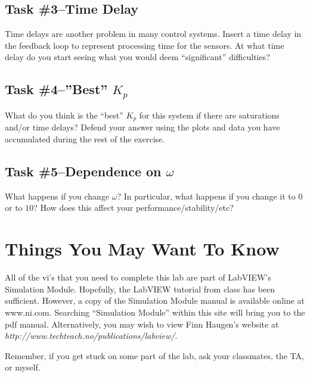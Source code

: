 \subsection{Task \#3--Time Delay}

Time delays are another problem in many control systems.  Insert a time delay in
the feedback loop to represent processing time for the sensors.  At what time
delay do you start seeing what you would deem ``significant'' difficulties?  

\subsection{Task \#4--''Best'' $K_p$}

What do you think is the ``best'' $K_p$ for this system if there are saturations
and/or time delays?  Defend your answer using the plots and data you have
accumulated during the rest of the exercise.  

\subsection{Task \#5--Dependence on $\omega$}

What happens if you change $\omega$?  In particular, what happens if you change it to
$0$ or to $10$?  How does this affect your performance/stability/etc?


\section{Things You May Want To Know}

All of the vi's that you need to complete this lab are part of LabVIEW's
Simulation Module.  Hopefully, the LabVIEW tutorial from class has been
sufficient.  However, a copy of the Simulation Module manual is available online
at www.ni.com.  Searching ``Simulation Module'' within this site will bring you
to the pdf manual.  Alternatively, you may wish to view Finn Haugen's website at
\emph{http://www.techteach.no/publications/labview/}.



\vspace{0.2in}
         

\noindent Remember, if you get stuck on some part of the lab, ask your
classmates, the TA, or myself.


